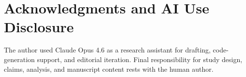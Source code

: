 \section*{Acknowledgments and AI Use Disclosure}

The author used Claude Opus 4.6 as a research assistant for drafting,
code-generation support, and editorial iteration. Final responsibility
for study design, claims, analysis, and manuscript content rests with
the human author.
